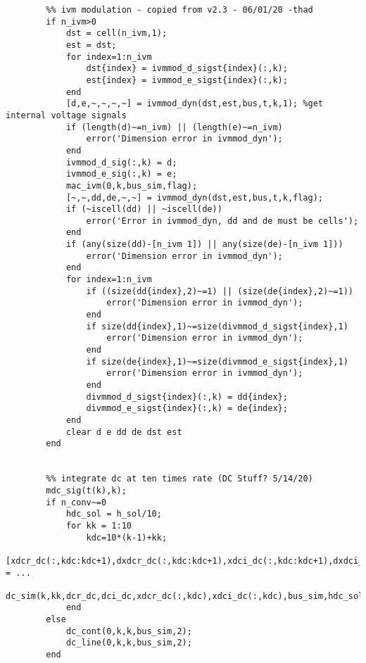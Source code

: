 \documentclass[12pt]{article}
\begin{document}
\begin{verbatim}
        %% ivm modulation - copied from v2.3 - 06/01/20 -thad
        if n_ivm>0
            dst = cell(n_ivm,1);
            est = dst;
            for index=1:n_ivm
                dst{index} = ivmmod_d_sigst{index}(:,k);
                est{index} = ivmmod_e_sigst{index}(:,k);
            end
            [d,e,~,~,~,~] = ivmmod_dyn(dst,est,bus,t,k,1); %get internal voltage signals
            if (length(d)~=n_ivm) || (length(e)~=n_ivm)
                error('Dimension error in ivmmod_dyn');
            end
            ivmmod_d_sig(:,k) = d;
            ivmmod_e_sig(:,k) = e;
            mac_ivm(0,k,bus_sim,flag);
            [~,~,dd,de,~,~] = ivmmod_dyn(dst,est,bus,t,k,flag);
            if (~iscell(dd) || ~iscell(de))
                error('Error in ivmmod_dyn, dd and de must be cells'); 
            end
            if (any(size(dd)-[n_ivm 1]) || any(size(de)-[n_ivm 1]))
                error('Dimension error in ivmmod_dyn'); 
            end
            for index=1:n_ivm
                if ((size(dd{index},2)~=1) || (size(de{index},2)~=1))
                    error('Dimension error in ivmmod_dyn'); 
                end
                if size(dd{index},1)~=size(divmmod_d_sigst{index},1)
                    error('Dimension error in ivmmod_dyn'); 
                end
                if size(de{index},1)~=size(divmmod_e_sigst{index},1)
                    error('Dimension error in ivmmod_dyn'); 
                end
                divmmod_d_sigst{index}(:,k) = dd{index};
                divmmod_e_sigst{index}(:,k) = de{index};
            end
            clear d e dd de dst est
        end
        
        
        %% integrate dc at ten times rate (DC Stuff? 5/14/20)
        mdc_sig(t(k),k);
        if n_conv~=0
            hdc_sol = h_sol/10;
            for kk = 1:10
                kdc=10*(k-1)+kk;
                [xdcr_dc(:,kdc:kdc+1),dxdcr_dc(:,kdc:kdc+1),xdci_dc(:,kdc:kdc+1),dxdci_dc(:,kdc:kdc+1)] = ...
                    dc_sim(k,kk,dcr_dc,dci_dc,xdcr_dc(:,kdc),xdci_dc(:,kdc),bus_sim,hdc_sol);
            end
        else
            dc_cont(0,k,k,bus_sim,2);
            dc_line(0,k,k,bus_sim,2);
        end
        

\end{verbatim}
\end{document}
